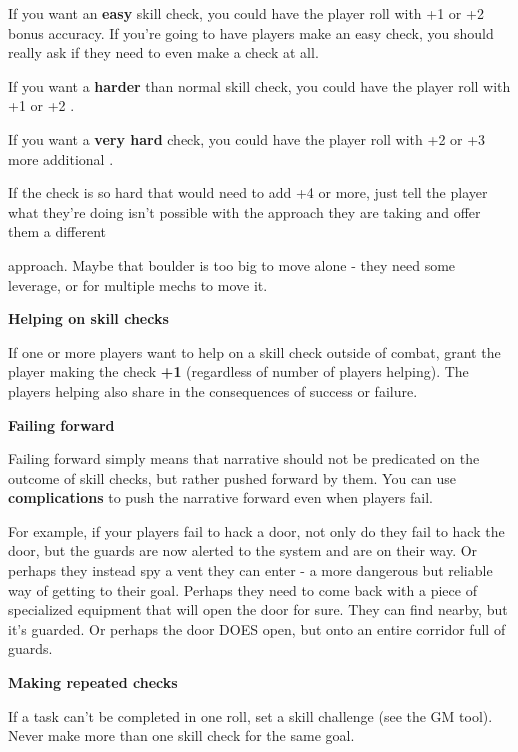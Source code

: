 If you want an \textbf{easy} skill check, you could have the player roll with +1 or +2 bonus accuracy. If
you’re going to have players make an easy check, you should really ask if they need to even
make a check at all.

If you want a \textbf{harder} than normal skill check, you could have the player roll with +1 or +2
\Difficulty.

If you want a \textbf{very hard} check, you could have the player roll with +2 or +3 more additional
\Difficulty.

If the check is so hard that would need to add +4 \Difficulty or more, just tell the player what
they’re doing isn’t possible with the approach they are taking and offer them a different

approach. Maybe that boulder is too big to move alone - they need some leverage, or for
multiple mechs to move it.

\begin{center}
\textbf{Helping on skill checks}
\end{center}

If one or more players want to help on a skill check outside of combat, grant the player making
the check \textbf{+1 \Accuracy} (regardless of number of players helping). The players helping also share
in the consequences of success or failure.

\begin{center}
\textbf{Failing forward}
\end{center}

Failing forward simply means that narrative should not be predicated on the outcome of skill
checks, but rather pushed forward by them. You can use \textbf{complications} to push the narrative
forward even when players fail.

For example, if your players fail to hack a door, not only do they fail to hack the door, but the
guards are now alerted to the system and are on their way. Or perhaps they instead spy a vent
they can enter - a more dangerous but reliable way of getting to their goal. Perhaps they need to
come back with a piece of specialized equipment that will open the door for sure. They can find
nearby, but it’s guarded. Or perhaps the door DOES open, but onto an entire corridor full of
guards.

\begin{center}
\textbf{Making repeated checks}
\end{center}

If a task can’t be completed in one roll, set a skill challenge (see the GM tool). Never make more
than one skill check for the same goal.


